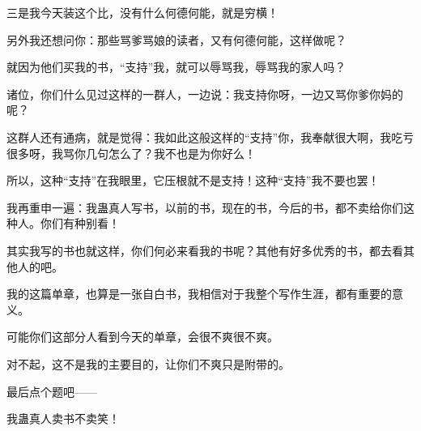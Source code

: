 \begin{this_body}
三是我今天装这个比，没有什么何德何能，就是穷横！

另外我还想问你：那些骂爹骂娘的读者，又有何德何能，这样做呢？

就因为他们买我的书，“支持”我，就可以辱骂我，辱骂我的家人吗？

诸位，你们什么见过这样的一群人，一边说：我支持你呀，一边又骂你爹你妈的呢？

这群人还有通病，就是觉得：我如此这般这样的“支持”你，我奉献很大啊，我吃亏很多呀，我骂你几句怎么了？我不也是为你好么！

所以，这种“支持”在我眼里，它压根就不是支持！这种“支持”我不要也罢！

我再重申一遍：我蛊真人写书，以前的书，现在的书，今后的书，都不卖给你们这种人。你们有种别看！

其实我写的书也就这样，你们何必来看我的书呢？其他有好多优秀的书，都去看其他人的吧。

我的这篇单章，也算是一张自白书，我相信对于我整个写作生涯，都有重要的意义。

可能你们这部分人看到今天的单章，会很不爽很不爽。

对不起，这不是我的主要目的，让你们不爽只是附带的。

最后点个题吧——

我蛊真人卖书不卖笑！

\end{this_body}

